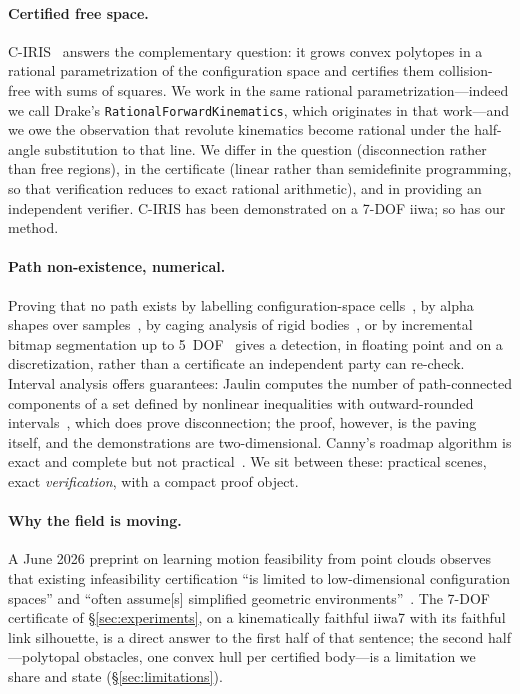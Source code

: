 \documentclass[10pt,twocolumn,letterpaper]{article}
\begin{document}
\paragraph{Certified free space.} C-IRIS~\cite{amice2022wafr,dai2024ciris} answers the complementary question: it grows convex polytopes in a rational parametrization of the configuration space and certifies them collision-free with sums of squares. We work in the same rational parametrization---indeed we call Drake's \texttt{RationalForwardKinematics}, which originates in that work---and we owe the observation that revolute kinematics become rational under the half-angle substitution to that line. We differ in the question (disconnection rather than free regions), in the certificate (linear rather than semidefinite programming, so that verification reduces to exact rational arithmetic), and in providing an independent verifier. C-IRIS has been demonstrated on a 7-DOF iiwa; so has our method.

\paragraph{Path non-existence, numerical.} Proving that no path exists by labelling configuration-space cells~\cite{zhang2008}, by alpha shapes over samples~\cite{mccarthy2012}, by caging analysis of rigid bodies~\cite{varava2021}, or by incremental bitmap segmentation up to 5~DOF~\cite{thomas2025} gives a detection, in floating point and on a discretization, rather than a certificate an independent party can re-check. Interval analysis offers guarantees: Jaulin computes the number of path-connected components of a set defined by nonlinear inequalities with outward-rounded intervals~\cite{jaulin2001}, which does prove disconnection; the proof, however, is the paving itself, and the demonstrations are two-dimensional. Canny's roadmap algorithm is exact and complete but not practical~\cite{canny1988}. We sit between these: practical scenes, exact \emph{verification}, with a compact proof object.

\paragraph{Why the field is moving.} A June 2026 preprint on learning motion feasibility from point clouds observes that existing infeasibility certification ``is limited to low-dimensional configuration spaces'' and ``often assume[s] simplified geometric environments''~\cite{feasibility2026}. The 7-DOF certificate of \S\ref{sec:experiments}, on a kinematically faithful iiwa7 with its faithful link silhouette, is a direct answer to the first half of that sentence; the second half---polytopal obstacles, one convex hull per certified body---is a limitation we share and state (\S\ref{sec:limitations}).
\end{document}

